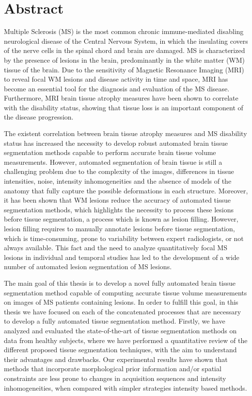 \chapter*{Abstract}


Multiple Sclerosis (MS)  is the most common chronic immune-mediated disabling neurological disease of the Central Nervous System, in which the insulating covers of the nerve cells in the spinal chord and brain are damaged. MS is characterized by the presence of lesions in the brain, predominantly in the white matter (WM) tissue of the brain. Due to the sensitivity of Magnetic Resonance Imaging (MRI) to reveal focal WM lesions and disease activity in time and space, MRI has become an essential tool for the diagnosis and evaluation of the MS disease. Furthermore, MRI brain tissue atrophy measures have been shown to correlate with the disability status, showing that tissue loss is an important component of the disease progression. 

The existent correlation between brain tissue atrophy measures and MS disability status has increased the necessity to develop robust automated brain tissue segmentation methods capable to perform accurate brain tissue volume measurements. However, automated segmentation of brain tissue is still a challenging problem due to the complexity of the images, differences in tissue intensities, noise, intensity inhomogeneities and the absence of models of the anatomy that fully capture the possible deformations in each structure. Moreover, it has been shown that WM lesions reduce the accuracy of automated tissue segmentation methods, which highlights the necessity to process these lesions before tissue segmentation, a process which is known as lesion filling. However, lesion filling requires to manually annotate lesions before tissue segmentation, which is time-consuming, prone to variability between expert radiologists, or not always available. This fact and the need to analyze quantitatively focal MS lesions in individual and temporal studies has led to the development of a wide number of automated lesion segmentation of MS lesions. 

The main goal of this thesis is to develop a novel fully automated brain tissue segmentation method capable of computing accurate tissue volume measurements on images of MS patients containing lesions. In order to fulfill this goal, in this thesis we have focused on each of the concatenated processes that are necessary to develop a fully automated tissue segmentation method. Firstly, we have analyzed and evaluated the state-of-the-art of tissue segmentation methods on data from healthy subjects, where we have performed a quantitative review of the different proposed tissue segmentation techniques, with the aim to understand their advantages and drawbacks. Our experimental results have shown that methods that incorporate morphological prior information and/or spatial constraints are less prone to changes in acquisition sequences and intensity inhomogeneities, when compared with simpler strategies intensity based methods.   

